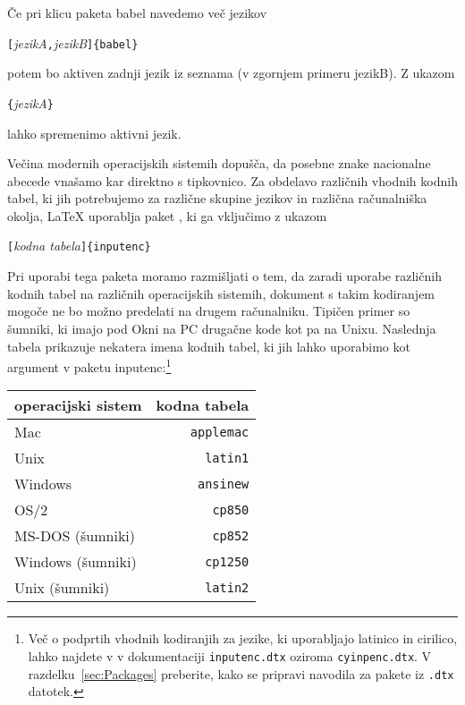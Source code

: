 Če pri klicu paketa babel navedemo več jezikov
\begin{lscommand}
\verb|[|\emph{jezikA}\verb|,|\emph{jezikB}\verb|]{babel}| 
\end{lscommand}
\noindent potem bo aktiven zadnji jezik iz seznama (v zgornjem primeru 
jezikB). Z ukazom 
\begin{lscommand}
\verb|{|\emph{jezikA}\verb|}|
\end{lscommand}
\noindent lahko spremenimo aktivni jezik.

\newcommand{\ieih}[1]{%
\index{encodings!input!#1@\texttt{#1}}%
\index{input encodings!#1@\texttt{#1}}%
\index{#1@\texttt{#1}}}
\newcommand{\iei}[1]{%
\ieih{#1}\texttt{#1}}
\newcommand{\feih}[1]{%
\index{encodings!font!#1@\texttt{#1}}%
\index{font encodings!#1@\texttt{#1}}%
\index{#1@\texttt{#1}}}
\newcommand{\fei}[1]{%
\feih{#1}\texttt{#1}}

Večina modernih operacijskih sistemih dopušča, da posebne znake 
nacionalne abecede vnašamo kar direktno s tipkovnico. 
Za obdelavo različnih vhodnih kodnih tabel, ki jih potrebujemo
za različne skupine jezikov in različna računalniška okolja,
\LaTeX{} uporablja paket
, ki ga vključimo z ukazom
\begin{lscommand}
\verb|[|\emph{kodna tabela}\verb|]{inputenc}| 
\end{lscommand}

Pri uporabi tega paketa moramo razmišljati o tem, da zaradi uporabe različnih kodnih tabel na
različnih operacijskih sistemih, dokument s takim kodiranjem mogoče ne bo možno 
predelati na drugem računalniku. Tipičen primer so šumniki, ki imajo pod Okni na PC
drugačne kode kot pa na Unixu. 
Naslednja tabela prikazuje nekatera 
imena kodnih tabel, ki jih lahko uporabimo kot argument v 
paketu \textsf{inputenc}:\footnote{Več o podprtih
vhodnih kodiranjih za jezike, ki uporabljajo latinico in
cirilico, lahko najdete v v dokumentaciji 
\texttt{inputenc.dtx} oziroma \texttt{cyinpenc.dtx}.
 V razdelku~\ref{sec:Packages} preberite, kako se
pripravi navodila za pakete iz \texttt{.dtx} datotek.}
\begin{center}
\begin{tabular}{l | r}
operacijski sistem & kodna tabela\\
\hline
Mac     &  \texttt{applemac} \\
Unix    &  \texttt{latin1} \\ 
Windows &  \texttt{ansinew} \\
OS/2    &  \texttt{cp850} \\
MS-DOS (šumniki) & \texttt{cp852} \\ 
Windows (šumniki) & \texttt{cp1250} \\
Unix (šumniki) & \texttt{latin2} \\
\end{tabular}
\end{center}

